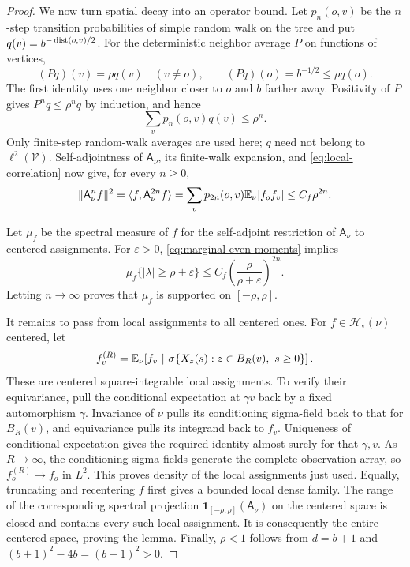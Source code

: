 \begin{proof}
We now turn spatial decay into an operator bound.  Let \(p_n(o,v)\)
be the \(n\)-step transition probabilities of simple random walk on
the tree and put \(q(v)=b^{-\operatorname{dist}(o,v)/2}\).  For the deterministic
neighbor average \(P\) on functions of vertices,
\[
 (Pq)(v)=\rho q(v)\quad(v\ne o),\qquad
 (Pq)(o)=b^{-1/2}\le\rho q(o).
\]
The first identity uses one neighbor closer to \(o\) and \(b\)
farther away.  Positivity of \(P\) gives \(P^nq\le\rho^nq\) by
induction, and hence
\[
 \sum_vp_n(o,v)q(v)\le\rho^n.
\]
Only finite-step random-walk averages are used here; \(q\) need
not belong to \(\ell^2(\mathcal V)\).
Self-adjointness of \(\mathsf A_\nu\), its finite-walk expansion, and
\eqref{eq:local-correlation} now give, for every \(n\ge0\),
\begin{equation}
\label{eq:marginal-even-moments}
 \|\mathsf A_\nu^nf\|^2
 =\langle f,\mathsf A_\nu^{2n}f\rangle
 =\sum_vp_{2n}(o,v)\mathbb E_\nu[f_of_v]
 \le C_f\rho^{2n}.
\end{equation}

Let \(\mu_f\) be the spectral measure of \(f\) for the self-adjoint
restriction of \(\mathsf A_\nu\) to centered assignments.  For
\(\varepsilon>0\), \eqref{eq:marginal-even-moments} implies
\[
 \mu_f\{|\lambda|\ge\rho+\varepsilon\}
 \le C_f\left(\frac{\rho}{\rho+\varepsilon}\right)^{2n}.
\]
Letting \(n\to\infty\) proves that \(\mu_f\) is supported on
\([-\rho,\rho]\).

It remains to pass from local assignments to all centered ones.
For \(f\in\mathcal H_{\mathrm v}(\nu)\) centered, let
\[
 f_v^{(R)}
 =\E_\nu\!\left[f_v\ \middle|\ 
     \sigma\{X_z(s):z\in B_R(v),\ s\ge0\}\right].
\]
These are centered square-integrable local assignments.
To verify their equivariance, pull the conditional expectation at
\(\gamma v\) back by a fixed automorphism \(\gamma\).  Invariance of
\(\nu\) pulls its conditioning sigma-field back to that for \(B_R(v)\),
and equivariance pulls its integrand back to \(f_v\).  Uniqueness of
conditional expectation gives the required identity almost surely
for that \(\gamma,v\).  As \(R\to\infty\), the conditioning
sigma-fields generate the complete observation array, so
\(f_o^{(R)}\to f_o\) in \(L^2\).  This proves density of the local
assignments just used.  Equally, truncating and recentering \(f\)
first gives a bounded local dense family.
The range of the corresponding spectral projection
\(\mathbf 1_{[-\rho,\rho]}(\mathsf A_\nu)\) on the centered space is
closed and contains
every such local assignment.  It is consequently the entire centered
space, proving the lemma.  Finally,
\(\rho<1\) follows from \(d=b+1\) and
\((b+1)^2-4b=(b-1)^2>0\).
\end{proof}

